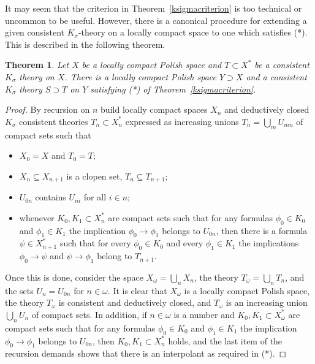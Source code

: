 \documentclass{article}
\newcommand{\gw}{\omega}
\newcommand{\gs}{\sigma}
\newtheorem{theorem}{Theorem}[section]
\theoremstyle{definition}
\begin{document}
\noindent It may seem that the criterion in Theorem~\ref{ksigmacriterion} is too technical or uncommon to be useful. However, there is a canonical procedure for extending a given consistent $K_\gs$-theory on a locally compact space to one which satisfies (*). This is described in the following theorem.

\begin{theorem}
\label{completiontheorem}
Let $X$ be a locally compact Polish space and $T\subset X^*$ be a consistent $K_\gs$ theory on $X$. There is a locally compact Polish space $Y\supset X$ and a consistent $K_\gs$ theory $S\supset T$ on $Y$ satisfying (*) of Theorem~\ref{ksigmacriterion}. 
\end{theorem}

\begin{proof}
By recursion on $n$ build locally compact spaces $X_n$ and deductively closed $K_\gs$ consistent theories $T_n\subset X_n^*$ expressed as increasing unions $T_n=\bigcup_mU_{mn}$ of compact sets such that

\begin{itemize}
\item $X_0=X$ and $T_0=T$;
\item $X_n\subseteq X_{n+1}$ is a clopen set, $T_n\subseteq T_{n+1}$;
\item $U_{0n}$ contains $U_{ni}$ for all $i\in n$;
\item whenever $K_0, K_1\subset X_n^*$ are compact sets such that for any formulas $\phi_0\in K_0$ and $\phi_1\in K_1$ the implication $\phi_0\to\phi_1$ belongs to $U_{0n}$, then there is a formula $\psi\in X_{n+1}^*$ such that for every $\phi_0\in K_0$ and every $\phi_1\in K_1$ the implications $\phi_0\to\psi$ and $\psi\to\phi_1$ belong to $T_{n+1}$.
\end{itemize}

\noindent Once this is done, consider the space $X_\gw=\bigcup_nX_n$, the theory $T_\gw=\bigcup_nT_n$, and the sets $U_n=U_{0n}$ for $n\in\gw$. It is clear that $X_\gw$ is a locally compact Polish space, the theory $T_\gw$ is consistent and deductively closed, and $T_\gw$ is an increasing union $\bigcup_nU_n$ of compact sets. In addition, if $n\in\gw$ is a number and $K_0, K_1\subset X_\gw^*$ are compact sets such that for any formulas $\phi_0\in K_0$ and $\phi_1\in K_1$ the implication $\phi_0\to\phi_1$ belongs to $U_{0n}$, then $K_0, K_1\subset X_n^*$ holds, and the last item of the recursion demands shows that there is an interpolant as required in (*).


\end{proof}
\end{document}
